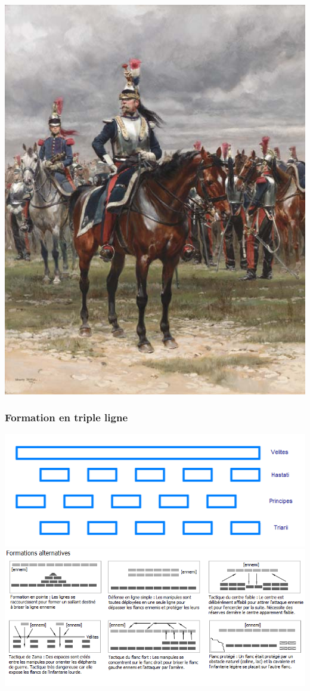 \documentclass{article}
\begin{document}
\includegraphics[width=0.5\paperwidth]{../ressources/cuirassiers}
\cite{heavy_cavalry}

\subsubsection{Formation en triple ligne}
\includegraphics[scale=0.4]{../ressources/Polybian_formation}
\includegraphics[scale=0.5]{../ressources/Formations_infanterie_romaine}
\cite{roman_infantry_tactics}
\end{document}
